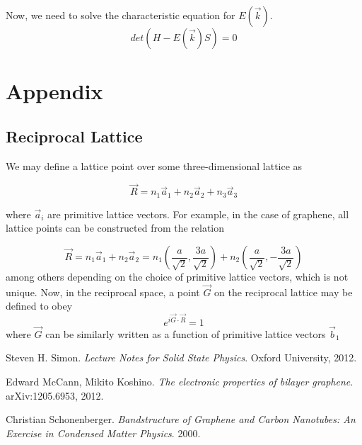 \documentclass{article}
\begin{document}
Now, we need to solve the characteristic equation for $E(\vec{k})$.
$$det(H - E(\vec{k})S) = 0$$

\section{Appendix}
\subsection{Reciprocal Lattice}
We may define a lattice point over some three-dimensional lattice as

\begin{equation}
\vec{R} = n_{1}\vec{a}_{1} + n_{2}\vec{a}_{2} + n_{3}\vec{a}_{3}
\end{equation}

where $\vec{a}_{i}$ are primitive lattice vectors. For example, in the case of
graphene, all lattice points can be constructed from the relation

\begin{equation}
\vec{R} = n_{1}\vec{a}_{1} + n_{2}\vec{a}_2 = n_{1}(\frac{a}{\sqrt{2}}, \frac{3a}{\sqrt{2}}) + n_{2}(\frac{a}{\sqrt{2}}, -\frac{3a}{\sqrt{2}})
\end{equation}
among others depending on the choice of primitive lattice vectors, which is not unique.
Now, in the reciprocal space, a point $\vec{G}$ on the reciprocal lattice may be defined to obey
\begin{equation}
e^{i\vec{G}\cdot\vec{R}} = 1
\end{equation}
where $\vec{G}$ can be similarly written as a function of primitive lattice vectors $\vec{b}_{1}$

\begin{thebibliography}{9}
Steven H. Simon.
\textit{Lecture Notes for Solid State Physics}.
Oxford University, 2012.

Edward McCann, Mikito Koshino.
\textit{The electronic properties of bilayer graphene}.
arXiv:1205.6953, 2012.

Christian Schonenberger.
\textit{Bandstructure of Graphene and Carbon Nanotubes: An Exercise in Condensed Matter Physics}.
2000.

\end{thebibliography}
\end{document}
